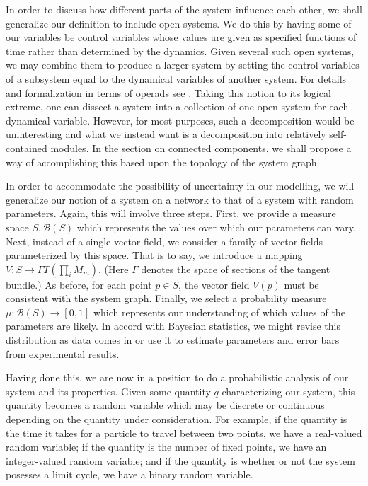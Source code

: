 In order to discuss how different parts of the system influence each other, we shall generalize our definition to include open systems.  We do this by having some of our variables be control variables whose values are given as specified functions of time rather than determined by the dynamics.  Given several such open systems, we may combine them to produce a larger system by setting the control variables of a subsystem equal to the dynamical variables of another system.  For details and formalization in terms of operads see \cite{Vagner2014}.  Taking this notion to its logical extreme, one can dissect a system into a collection of one open system for each dynamical variable.  However, for most purposes, such a decomposition would be uninteresting and what we instead want is a decomposition into relatively self-contained modules.  In the section on connected components, we shall propose a way of accomplishing this based upon the topology of the system graph.

In order to accommodate the possibility of uncertainty in our modelling,
we will generalize our notion of a system on a network to that of a
system with random parameters.  Again, this will involve three
steps. First, we provide a measure space $S, \mathcal{B}(S)$ which represents the
values over which our parameters can vary. Next, instead of a single
vector field, we consider a family of vector fields parameterized by
this space. That is to say, we introduce a mapping $V \colon S \to \Gamma T(\prod_i M_m)$.
(Here $\Gamma$ denotes the space of sections of the tangent bundle.)
As before, for each point $p \in S$, the vector field $V(p)$ must be consistent with
the system graph. Finally, we select a probability measure $\mu \colon
\mathcal{B}(S) \to [0,1]$ which represents our understanding of which values of the parameters
are likely. In accord with Bayesian statistics, we might revise this
distribution as data comes in or use it to estimate parameters and error
bars from experimental results.

Having done this, we are now in a position to do a probabilistic analysis
of our system and its properties.  Given some quantity $q$ characterizing
our system, this quantity becomes a random variable which may be discrete or
continuous depending on the quantity under consideration.  For example, if
the quantity is the time it takes for a particle to travel between two points,
we have a real-valued random variable; if the quantity is the number of fixed
points, we have an integer-valued random variable; and if the quantity is
whether or not the system posesses a limit cycle, we have a binary random
variable.

